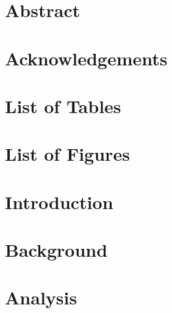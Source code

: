 




%




\setcounter{secnumdepth}{-1}
\frontmatter{}

\chapter{Abstract}


\chapter{Acknowledgements}


\pagebreak


\setcounter{tocdepth}{3}
\setcounter{secnumdepth}{3}

\tableofcontents*
\chapter*{List of Tables}
\chapter*{List of Figures}








\mainmatter{}

\chapter{Introduction}\label{intro}


\chapter{Background}\label{background}


\chapter{Analysis}\label{analysis}


